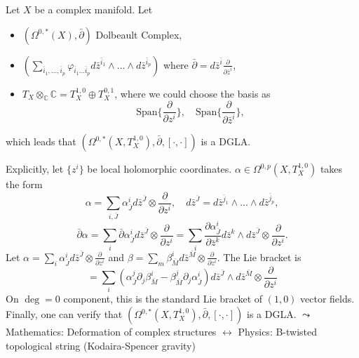 \documentclass[10pt]{article}
\begin{document}
\begin{example}[Dolbeault + Lie = DGLA]
  Let $X$ be a complex manifold. Let
  \begin{itemize}
    \item $(\Omega^{0,*}(X), \bar{\partial})$ Dolbeault Complex,
    \item $(\sum_{\bar{i}_1,...,\bar{i}_p} \varphi_{\bar{i}_1...\bar{i}_p} d\bar{z}^{\bar{i}_1} \wedge ... \wedge d\bar{z}^{\bar{i}_p})$ where $\bar{\partial} = d\bar{z}^{\bar{i}} \frac{\partial}{\partial \bar{z}^i}$,
    \item $T_X \otimes_{\mathbb{C}} \mathbb{C} = T_X^{1,0} \oplus T_X^{0,1}$, where we could choose the basis as
      \begin{equation*}
        \text{Span}\{\frac{\partial}{\partial z^i}\}, \quad \text{Span}\{\frac{\partial}{\partial \bar{z}^i}\},
      \end{equation*}
  \end{itemize}
  which leads that $(\Omega^{0,*}(X, T_X^{1,0}), \bar{\partial}, [\cdot,\cdot])$ is a DGLA.

  Explicitly, let $\{z^i\}$ be local holomorphic coordinates.
  $\alpha \in \Omega^{0,p}(X, T_X^{1,0})$ takes the form
  \begin{equation*}
    \alpha = \sum_{i,\bar{J}} \alpha_{\bar{J}}^i d\bar{z}^{\bar{J}} \otimes \frac{\partial}{\partial z^i}, \quad d\bar{z}^{\bar{J}} = d\bar{z}^{\bar{j}_1} \wedge ... \wedge d\bar{z}^{\bar{j}_p},
  \end{equation*}
  \begin{equation*}
    \bar{\partial}\alpha = \sum_i \bar{\partial}\alpha_{\bar{J}}^i d\bar{z}^{\bar{J}} \otimes \frac{\partial}{\partial z^i} = \sum_i \frac{\partial \alpha_{\bar{J}}^i}{\partial \bar{z}^k} d\bar{z}^k \wedge d\bar{z}^{\bar{J}} \otimes \frac{\partial}{\partial z^i}.
  \end{equation*}
  Let $\alpha = \sum_i \alpha_{\bar{J}}^i d\bar{z}^{\bar{J}} \otimes \frac{\partial}{\partial z^i}$ and $\beta = \sum_m \beta_{\bar{M}}^i d\bar{z}^{\bar{M}} \otimes \frac{\partial}{\partial z^i}$.
  The Lie bracket is
  \begin{equation*}
    [\alpha, \beta] = \sum_i \left(\alpha_{\bar{J}}^j \partial_j \beta_{\bar{M}}^i - \beta_{\bar{M}}^j \partial_j \alpha_{\bar{J}}^i\right) d\bar{z}^{\bar{J}} \wedge d\bar{z}^{\bar{M}} \otimes \frac{\partial}{\partial z^i}
  \end{equation*}
  On $\deg = 0$ component, this is the standard Lie bracket of $(1,0)$ vector fields. Finally, one can verify that $(\Omega^{0,*}(X, T_X^{1,0}), \bar{\partial}, [\cdot,\cdot])$ is a DGLA.
  \noindent $\leadsto$ Mathematics: Deformation of complex structures $\longleftrightarrow$ Physics: B-twisted topological string (Kodaira-Spencer gravity)
\end{example}
\end{document}
